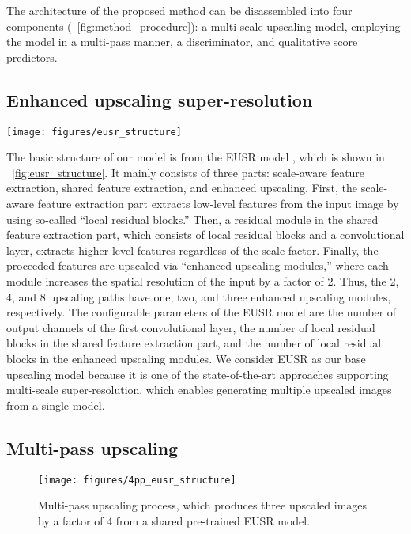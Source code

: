 \documentclass[runningheads]{llncs}
\begin{document}
The architecture of the proposed method can be disassembled into four components (\figurename~\ref{fig:method_procedure}): a multi-scale upscaling model, employing the model in a multi-pass manner, a discriminator, and qualitative score predictors.

\subsection{Enhanced upscaling super-resolution}
\label{sec:eusr}

\begin{figure*}[t]
	\centering
	\texttt{[image: figures/eusr\_structure]}
	\caption{Structure of the EUSR model \cite{kim2018deep}.}
	\label{fig:eusr_structure}
\end{figure*}

The basic structure of our model is from the EUSR model \cite{kim2018deep}, which is shown in \figurename~\ref{fig:eusr_structure}.
It mainly consists of three parts: scale-aware feature extraction, shared feature extraction, and enhanced upscaling.
First, the scale-aware feature extraction part extracts low-level features from the input image by using so-called ``local residual blocks.''
Then, a residual module in the shared feature extraction part, which consists of local residual blocks and a convolutional layer, extracts higher-level features regardless of the scale factor.
Finally, the proceeded features are upscaled via ``enhanced upscaling modules,'' where each module increases the spatial resolution of the input by a factor of 2.
Thus, the 2, 4, and 8 upscaling paths have one, two, and three enhanced upscaling modules, respectively.
The configurable parameters of the EUSR model are the number of output channels of the first convolutional layer, the number of local residual blocks in the shared feature extraction part, and the number of local residual blocks in the enhanced upscaling modules.
We consider EUSR as our base upscaling model because it is one of the state-of-the-art approaches supporting multi-scale super-resolution, which enables generating multiple upscaled images from a single model.

\subsection{Multi-pass upscaling}
\label{sec:multipass_upscaling}

\begin{figure}[t]
	\centering
	\texttt{[image: figures/4pp\_eusr\_structure]}
	\caption{Multi-pass upscaling process, which produces three upscaled images by a factor of 4 from a shared pre-trained EUSR model.}
	\label{fig:4pp_eusr_structure}
\end{figure}
\end{document}
